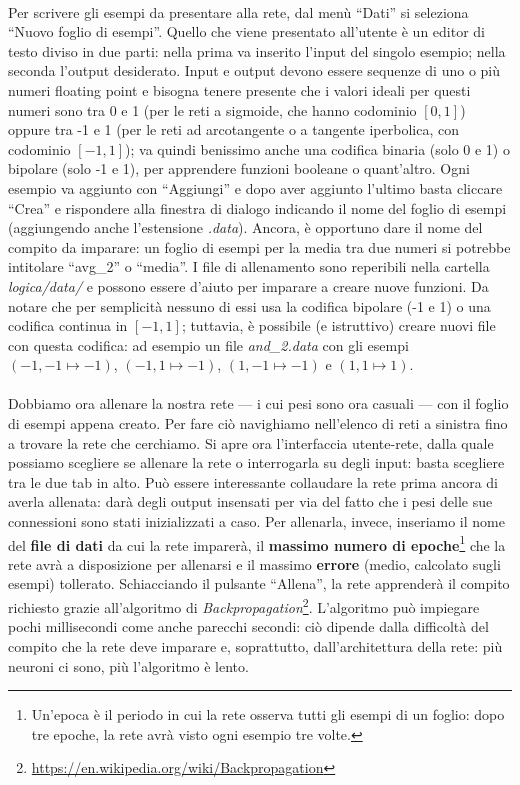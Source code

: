 \documentclass{article}
\begin{document}
\paragraph{} Per scrivere gli esempi da presentare alla rete, dal menù “Dati” si seleziona “Nuovo foglio di esempi”. Quello che viene presentato all'utente è un editor di testo diviso in due parti: nella prima va inserito l'input del singolo esempio; nella seconda l'output desiderato. Input e output devono essere sequenze di uno o più numeri floating point e bisogna tenere presente che i valori ideali per questi numeri sono tra 0 e 1 (per le reti a sigmoide, che hanno codominio $[0,1]$) oppure tra -1 e 1 (per le reti ad arcotangente o a tangente iperbolica, con codominio $[-1,1]$); va quindi benissimo anche una codifica binaria (solo 0 e 1) o bipolare (solo -1 e 1), per apprendere funzioni booleane o quant'altro. Ogni esempio va aggiunto con “Aggiungi” e dopo aver aggiunto l'ultimo basta cliccare “Crea” e rispondere alla finestra di dialogo indicando il nome del foglio di esempi (aggiungendo anche l'estensione \textit{.data}). Ancora, è opportuno dare il nome del compito da imparare: un foglio di esempi per la media tra due numeri si potrebbe intitolare “avg\_2” o “media”. I file di allenamento sono reperibili nella cartella \emph{logica/data/} e possono essere d'aiuto per imparare a creare nuove funzioni. Da notare che per semplicità nessuno di essi usa la codifica bipolare (-1 e 1) o una codifica continua in $[-1,1]$; tuttavia, è possibile (e istruttivo) creare nuovi file con questa codifica: ad esempio un file \emph{and\_2.data} con gli esempi $(-1, -1 \mapsto -1)$, $(-1, 1 \mapsto -1)$, $(1, -1 \mapsto -1)$ e $(1, 1 \mapsto 1)$.

\paragraph{} Dobbiamo ora allenare la nostra rete --- i cui pesi sono ora casuali --- con il foglio di esempi appena creato. Per fare ciò navighiamo nell'elenco di reti a sinistra fino a trovare la rete che cerchiamo. Si apre ora l'interfaccia utente-rete, dalla quale possiamo scegliere se allenare la rete o interrogarla su degli input: basta scegliere tra le due tab in alto. Può essere interessante collaudare la rete prima ancora di averla allenata: darà degli output insensati per via del fatto che i pesi delle sue connessioni sono stati inizializzati a caso. Per allenarla, invece, inseriamo il nome del \textbf{file di dati} da cui la rete imparerà, il \textbf{massimo numero di epoche}\footnote{Un'epoca è il periodo in cui la rete osserva tutti gli esempi di un foglio: dopo tre epoche, la rete avrà visto ogni esempio tre volte.} che la rete avrà a disposizione per allenarsi e il massimo \textbf{errore} (medio, calcolato sugli esempi) tollerato. Schiacciando il pulsante “Allena”, la rete apprenderà il compito richiesto grazie all'algoritmo di \emph{Backpropagation}\footnote{\url{https://en.wikipedia.org/wiki/Backpropagation}}. L'algoritmo può impiegare pochi millisecondi come anche parecchi secondi: ciò dipende dalla difficoltà del compito che la rete deve imparare e, soprattutto, dall'architettura della rete: più neuroni ci sono, più l'algoritmo è lento.
\end{document}
